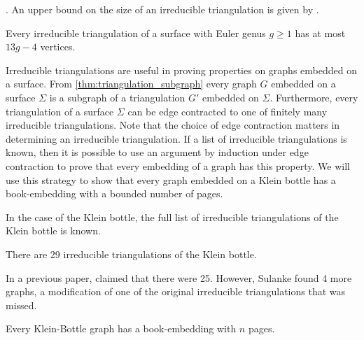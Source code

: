 . An upper bound on the size of an irreducible triangulation is given by \textcite{joretIrreducibleTriangulationsAre2010}.

\begin{theorem}\textcite{joretIrreducibleTriangulationsAre2010}
    Every irreducible triangulation of a surface with Euler genus $g \geq 1$ has at most $13g - 4$ vertices. 
\end{theorem}

Irreducible triangulations are useful in proving properties on graphs embedded on a surface. From \cref{thm:triangulation_subgraph} every graph $G$ embedded on a surface $\Sigma$ is a subgraph of a triangulation $G'$ embedded on $\Sigma$. Furthermore, every triangulation of a surface $\Sigma$ can be edge contracted to one of finitely many irreducible triangulations. Note that the choice of edge contraction matters in determining an irreducible triangulation. If a list of irreducible triangulations is known, then it is possible to use an argument by induction under edge contraction to prove that every embedding of a graph has this property. We will use this strategy to show that every graph embedded on a Klein bottle has a book-embedding with a bounded number of pages. 

In the case of the Klein bottle, the full list of irreducible triangulations of the Klein bottle is known. 
\begin{theorem}
    There are 29 irreducible triangulations of the Klein bottle. 
\end{theorem} 
In a previous paper, \textcite{lawrencenkoIrreducibleTriangulationsKlein1997} claimed that there were 25. However, Sulanke found 4 more graphs, a modification of one of the original irreducible triangulations that was missed. 

\begin{theorem}
    Every Klein-Bottle graph has a book-embedding with $n$ pages.
\end{theorem}

